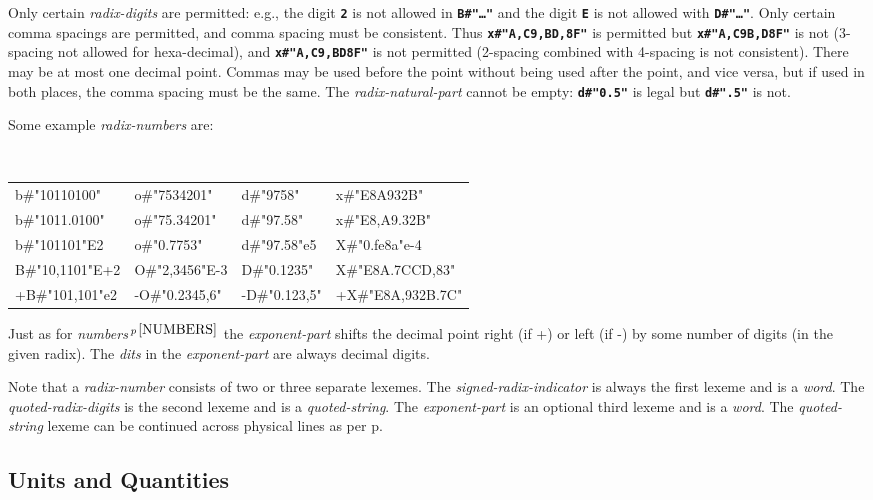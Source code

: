 \documentclass[12pt]{article}
\newcommand{\TT}[1]{{\tt \bfseries #1}}
\newcommand{\pagref}[1]{p\pageref{#1}}
\newcommand{\pagnote}[1]{$\,^{p\,\pageref{#1}}$}
\newenvironment{indpar}[1][0.3in]%
	{\begin{list}{}%
		     {\setlength{\itemsep}{0in}%
		      \setlength{\topsep}{0in}%
		      \setlength{\parsep}{1ex}%
		      \setlength{\labelwidth}{#1}%
		      \setlength{\leftmargin}{#1}%
		      \addtolength{\leftmargin}{\labelsep}}%
	 \item}%
	{\end{list}}
\begin{document}
Only certain {\em radix-digits} are permitted: e.g., the digit \TT{2}
is not allowed in \TT{B\#"\ldots"} and the digit \TT{E} is not allowed
with \TT{D\#"\ldots"}.  Only certain comma spacings are permitted, and comma
spacing must be consistent.  Thus \TT{x\#"A,C9,BD,8F"} is permitted but
\TT{x\#"A,C9B,D8F"} is not (3-spacing not allowed for hexa-decimal),
and \TT{x\#"A,C9,BD8F"} is not permitted (2-spacing combined with
4-spacing is not consistent).
There may be at most one decimal point.
Commas may be used before the point without being used after the
point, and vice versa, but if used in both places, the comma spacing
must be the same.  The {\em radix-natural-part}
cannot be empty: \TT{d\#"0.5"} is legal but \TT{d\#".5"} is not.

Some example {\em radix-numbers} are:

\begin{indpar}[0.1in]
\tt
\begin{tabular}{@{}l@{~~}l@{~~}l@{~~}l@{}}
b\#"10110100"	& o\#"7534201"   & d\#"9758"	& x\#"E8A932B" \\
b\#"1011.0100"	& o\#"75.34201"  & d\#"97.58"	& x\#"E8,A9.32B" \\
b\#"101101"E2	& o\#"0.7753"    & d\#"97.58"e5	& X\#"0.fe8a"e-4 \\
B\#"10,1101"E+2	& O\#"2,3456"E-3 & D\#"0.1235"	& X\#"E8A.7CCD,83" \\
+B\#"101,101"e2	& -O\#"0.2345,6" & -D\#"0.123,5" & +X\#"E8A,932B.7C" \\
\end{tabular}
\end{indpar}

Just as for {\em numbers}\pagnote{NUMBERS}
the {\em exponent-part} shifts the decimal point right (if +) or left (if -)
by some number of digits (in the given radix).  The {\em dits}
in the {\em exponent-part} are always decimal digits.

Note that a {\em radix-number} consists of two or three separate
lexemes.  The {\em signed-radix-indicator} is always the first
lexeme and is a {\em word}.  The {\em quoted-radix-digits}
is the second lexeme and is a {\em quoted-string}.  The
{\em exponent-part} is an optional third lexeme and is a {\em word}.
The {\em quoted-string} lexeme can be continued across physical lines
as per \pagref{QUOTED-STRING-CONCATENATION}.

\subsection{Units and Quantities}
\label{UNITS-AND-QUANTITIES}
\end{document}
